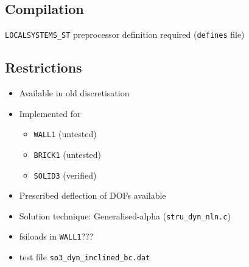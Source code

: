 \subsection{Compilation}
\texttt{LOCALSYSTEMS\_ST} preprocessor definition required (\texttt{defines} file)

\subsection{Restrictions}
\begin{itemize}
\item Available in old discretisation
\item Implemented for 
   \begin{itemize}
   \item \texttt{WALL1} (untested)
   \item \texttt{BRICK1} (untested)
   \item \texttt{SOLID3} (verified)
   \end{itemize}
\item Prescribed deflection of DOFs available
\item Solution technique: Generalised-alpha (\texttt{stru\_dyn\_nln.c})
\item fsiloads in \texttt{WALL1}???
\item test file \texttt{so3\_dyn\_inclined\_bc.dat}
\end{itemize}